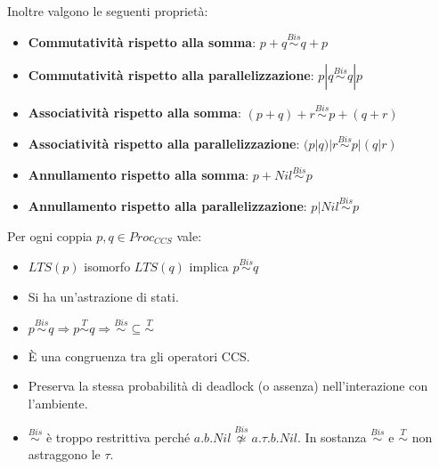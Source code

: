 \begin{osservazione}
    Inoltre valgono le seguenti proprietà:
    \begin{itemize}
        \item \textbf{Commutatività rispetto alla somma}: $p + q \stackrel{Bis}{\sim}
                  q + p$
        \item \textbf{Commutatività rispetto alla parallelizzazione}: $p | q
                  \stackrel{Bis}{\sim} q | p$
        \item \textbf{Associatività rispetto alla somma}: $(p + q) + r
                  \stackrel{Bis}{\sim} p + (q + r)$
        \item \textbf{Associatività rispetto alla parallelizzazione}: $(p | q) | r
                  \stackrel{Bis}{\sim} p | (q | r)$
        \item \textbf{Annullamento rispetto alla somma}: $p + Nil \stackrel{Bis}{\sim}
                  p$
        \item \textbf{Annullamento rispetto alla parallelizzazione}: $p | Nil
                  \stackrel{Bis}{\sim} p$
    \end{itemize}
\end{osservazione}
\begin{osservazione}
    Per ogni coppia $p, q \in Proc_{CCS}$ vale:
    \begin{itemize}
        \item $LTS(p)$ isomorfo $LTS(q)$ implica $p \stackrel{Bis}{\sim} q$
        \item Si ha un'astrazione di stati.
        \item $p \stackrel{Bis}{\sim} q \Rightarrow p \stackrel{T}{\sim} q \Rightarrow
                  \stackrel{Bis}{\sim} \subseteq \stackrel{T}{\sim}$
        \item È una congruenza tra gli operatori CCS.
        \item Preserva la stessa probabilità di deadlock (o assenza) nell'interazione
              con l'ambiente.
        \item $\stackrel{Bis}{\sim}$ è troppo restrittiva perché $a.b.Nil
                  \stackrel{Bis}{\not\simeq} a.\tau.b.Nil$. In sostanza $\stackrel{Bis}{\sim}$ e
              $\stackrel{T}{\sim}$ non astraggono le $\tau$.
    \end{itemize}
\end{osservazione}
